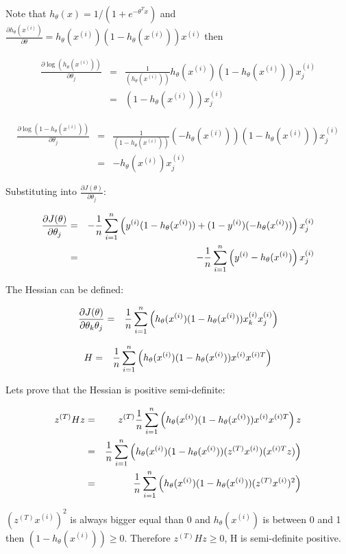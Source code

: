 \begin{answer}
Note that $h_{\theta}(x) = 1 / (1 + e^{-\theta^T x})$ and $\frac{\partial h_{\theta}(x^{(i)})}{\partial \theta} = h_{\theta}(x^{(i)})(1-h_{\theta}(x^{(i)}))x^{(i)}$ then

\begin{eqnarray*}
\frac{\partial \log(h_{\theta}(x^{(i)}))}{\partial \theta_{j}} &=& \frac{1}{(h_{\theta}(x^{(i)}))}h_{\theta}(x^{(i)})(1-h_{\theta}(x^{(i)}))x^{(i)}_{j} \\
&=& (1-h_{\theta}(x^{(i)}))x^{(i)}_{j} 
\end{eqnarray*}

\begin{eqnarray*}
\frac{\partial \log(1-h_{\theta}(x^{(i)}))}{\partial \theta_{j}} &=& \frac{1}{(1-h_{\theta}(x^{(i)}))}(-h_{\theta}(x^{(i)}))(1-h_{\theta}(x^{(i)}))x^{(i)}_{j} \\
&=& -h_{\theta}(x^{(i)})x^{(i)}_{j} 
\end{eqnarray*}

Substituting into $\frac{\partial J(\theta)}{\partial \theta_{j}}$:

 \begin{eqnarray*}
\frac{\partial J(\theta)}{\partial \theta_{j}} 
&=& -\frac{1}{{n}} \sum_{i=1}^{n} \left(y^{(i)} (1-h_{\theta}(x^{(i)}))  +  (1 - y^{(i)})(-h_{\theta}(x^{(i)})) \right)x^{(i)}_{j} \\
&=& -\frac{1}{{n}} \sum_{i=1}^{n} \left( y^{(i)} - h_{\theta}(x^{(i)}) \right)x^{(i)}_{j} 
  \end{eqnarray*}
  
The Hessian can be defined:

\begin{eqnarray*}
\frac{\partial J(\theta)}{\partial \theta_{k} \theta_{j}} 
&=& \frac{1}{{n}} \sum_{i=1}^{n} \left( h_{\theta}(x^{(i)})(1-h_{\theta}(x^{(i)})) x^{(i)}_{k} x^{(i)}_{j} \right)
\end{eqnarray*}
 
 
\begin{eqnarray*}
H &=& \frac{1}{{n}} \sum_{i=1}^{n} \left( h_{\theta}(x^{(i)})(1-h_{\theta}(x^{(i)})) x^{(i)} x^{(i)T} \right)
\end{eqnarray*}
 
Lets prove that the Hessian is positive semi-definite:

\begin{eqnarray*}
z^{(T)}Hz&=& z^{(T)}\frac{1}{{n}} \sum_{i=1}^{n} \left( h_{\theta}(x^{(i)})(1-h_{\theta}(x^{(i)})) x^{(i)} x^{(i)T} \right)z \\
&=& \frac{1}{{n}} \sum_{i=1}^{n} \left( h_{\theta}(x^{(i)})(1-h_{\theta}(x^{(i)})) (z^{(T)}x^{(i)}) (x^{(i)T} z)\right) \\
&=&  \frac{1}{{n}} \sum_{i=1}^{n} \left( h_{\theta}(x^{(i)})(1-h_{\theta}(x^{(i)})) (z^{(T)}x^{(i)})^{2} \right)
\end{eqnarray*}
  
$(z^{(T)}x^{(i)})^{2}$ is always bigger equal than 0 and $h_{\theta}(x^{(i)})$ is between 0 and 1 then $(1-h_{\theta}(x^{(i)}))\geq0$.  Therefore  $z^{(T)}Hz\geq0$, H is semi-definite positive.
\end{answer}

